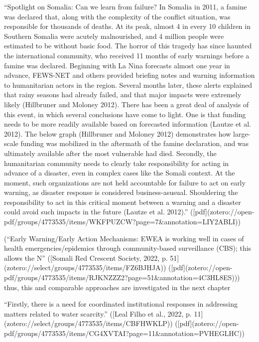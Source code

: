 “Spotlight on Somalia: Can we learn from failure? In Somalia in 2011, a famine was declared that, along with the complexity of the conflict situation, was responsible for thousands of deaths. At its peak, almost 4 in every 10 children in Southern Somalia were acutely malnourished, and 4 million people were estimated to be without basic food. The horror of this tragedy has since haunted the international community, who received 11 months of early warnings before a famine was declared. Beginning with La Nina forecasts almost one year in advance, FEWS-NET and others provided briefing notes and warning information to humanitarian actors in the region. Several months later, these alerts explained that rainy seasons had already failed, and that major impacts were extremely likely (Hillbruner and Moloney 2012). There has been a great deal of analysis of this event, in which several conclusions have come to light. One is that funding needs to be more readily available based on forecasted information (Lautze et al. 2012). The below graph (Hillbruner and Moloney 2012) demonstrates how large-scale funding was mobilized in the aftermath of the famine declaration, and was ultimately available after the most vulnerable had died. Secondly, the humanitarian community needs to clearly take responsibility for acting in advance of a disaster, even in complex cases like the Somali context. At the moment, such organizations are not held accountable for failure to act on early warning, as disaster response is considered business-asusual. Shouldering the responsibility to act in this critical moment between a warning and a disaster could avoid such impacts in the future (Lautze et al. 2012).” ([pdf](zotero://open-pdf/groups/4773535/items/WKFPUZCW?page=7&annotation=LIY2ABLI))

(“Early Warning/Early Action Mechanisms: EWEA is working well in cases of health emergencies/epidemics through community-based surveillance (CBS); this allows the N” ([Somali Red Crescent Society, 2022, p. 51](zotero://select/groups/4773535/items/FZ6BJHJA)) ([pdf](zotero://open-pdf/groups/4773535/items/RJKNZZZ2?page=51&annotation=4C3HL8ES))) 
thus, this and comparable approaches are investigated in the next chapter

“Firstly, there is a need for coordinated institutional responses in addressing matters related to water scarcity.” ([Leal Filho et al., 2022, p. 11](zotero://select/groups/4773535/items/CBFHWKLP)) ([pdf](zotero://open-pdf/groups/4773535/items/CG4XVTAI?page=11&annotation=PVHEGLHC))

